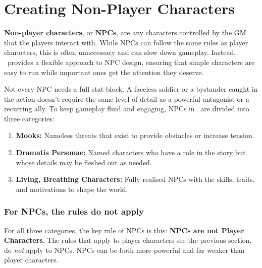 \section{Creating Non-Player Characters}\label{core:npcs}

\textbf{Non-player characters}, or \textbf{NPCs}, are any characters controlled by the GM that the players interact with. While NPCs can follow the same rules as player characters, this is often unnecessary and can slow down gameplay. Instead, \wyrd\ provides a flexible approach to NPC design, ensuring that simple characters are easy to run while important ones get the attention they deserve.

Not every NPC needs a full stat block. A faceless soldier or a bystander caught in the action doesn’t require the same level of detail as a powerful antagonist or a recurring ally. To keep gameplay fluid and engaging, NPCs in \wyrd\ are divided into three categories:

\begin{enumerate}
    \item \textbf{Mooks:} Nameless threats that exist to provide obstacles or increase tension.
    \item \textbf{Dramatis Personae:} Named characters who have a role in the story but whose details may be fleshed out as needed.
    \item \textbf{Living, Breathing Characters:} Fully realised NPCs with the skills, traits, and motivations to shape the world.
\end{enumerate}


\subsubsection{For NPCs, the rules do not apply}
For all three categories, the key rule of NPCs is this: \textbf{NPCs are not Player Characters}. The rules that apply to player characters see the previous section, do \emph{not} apply to NPCs. NPCs can be both more powerful and far weaker than player characters.

